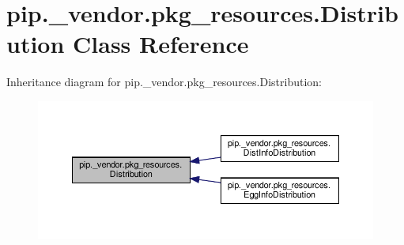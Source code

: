 \hypertarget{classpip_1_1__vendor_1_1pkg__resources_1_1Distribution}{}\section{pip.\+\_\+vendor.\+pkg\+\_\+resources.\+Distribution Class Reference}
\label{classpip_1_1__vendor_1_1pkg__resources_1_1Distribution}


Inheritance diagram for pip.\+\_\+vendor.\+pkg\+\_\+resources.\+Distribution\+:
\nopagebreak
\begin{figure}[H]
\begin{center}
\leavevmode
\includegraphics[width=350pt]{classpip_1_1__vendor_1_1pkg__resources_1_1Distribution__inherit__graph}
\end{center}
\end{figure}
